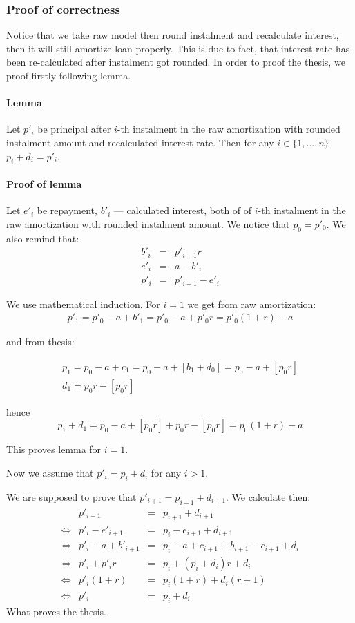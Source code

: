 \documentclass[letterpaper,11pt]{article}
\begin{document}
\subsubsection {Proof of correctness}
Notice that we take raw model then round instalment and recalculate interest, then it will still amortize loan properly. This is due to fact, that interest rate has been re-calculated after instalment got rounded. In order to proof the thesis, we proof firstly following lemma.

\paragraph {Lemma}
Let $p'_i$ be principal after $i$-th instalment in the raw amortization with rounded instalment amount and recalculated interest rate.
Then for any $i \in \{1,...,n\}$ $p_i + d_i = p'_i$.

\paragraph {Proof of lemma}
Let $e'_i$ be repayment, $b'_i$ --- calculated interest, both of of $i$-th instalment in the raw amortization with rounded instalment amount. We notice that $p_0 = p'_0$. We also remind that:
$$\begin{array}{rcl}
b'_i & = & p'_{i-1}r\\
e'_i & = & a - b'_i\\
p'_i & = & p'_{i-1} - e'_i
\end{array}$$


We use mathematical induction.
For $i=1$ we get from raw amortization:
\begin{eqnarray*}
p'_1 = p'_0 - a + b'_1 = p'_0 - a + p'_0r = p'_0(1 + r) - a
\end{eqnarray*}

and from thesis:

\begin{eqnarray*}
p_1 = p_0 - a + c_1 = p_0 - a + [b_1 + d_0] = p_0 - a + [p_0r]\\
d_1 = p_0r - [p_0r]
\end{eqnarray*}

hence
$$ p_1 + d_1 = p_0 - a + [p_0r] + p_0r - [p_0r] = p_0(1+r) - a $$

This proves lemma for $i=1$.

Now we assume that $p'_i = p_i + d_i$ for any $i > 1$.

We are supposed to prove that $p'_{i+1} = p_{i+1} + d_{i+1}$. We calculate then:
$$\begin{array}{rrcl}
& p'_{i+1} & = & p_{i+1} + d_{i+1}\\
\Leftrightarrow & p'_i - e'_{i+1} & = & p_i - e_{i+1} + d_{i+1}\\
\Leftrightarrow & p'_i - a + b'_{i+1} & = & p_i - a + c_{i+1} + b_{i+1} - c_{i+1} + d_i\\
\Leftrightarrow & p'_i + p'_ir & = & p_i + (p_i + d_i)r + d_i\\
\Leftrightarrow & p'_i(1+r) & = & p_i(1+r) + d_i(r+1)\\
\Leftrightarrow & p'_i & = & p_i + d_i
\end{array}$$
What proves the thesis.
\end{document}
